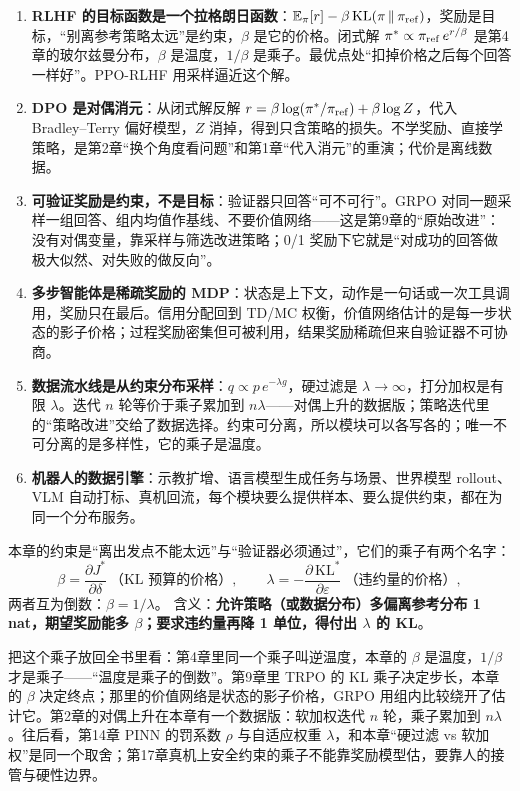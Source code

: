 \begin{enumerate}
    \item \textbf{RLHF 的目标函数是一个拉格朗日函数}：$\mathbb{E}_\pi[r] - \beta\,\mathrm{KL}(\pi\,\|\,\pi_{\rm ref})$，奖励是目标，“别离参考策略太远”是约束，$\beta$ 是它的价格。闭式解 $\pi^* \propto \pi_{\rm ref}\,e^{r/\beta}$ 是第4章的玻尔兹曼分布，$\beta$ 是温度，$1/\beta$ 是乘子。最优点处“扣掉价格之后每个回答一样好”。PPO-RLHF 用采样逼近这个解。

    \item \textbf{DPO 是对偶消元}：从闭式解反解 $r = \beta\log(\pi^*/\pi_{\rm ref}) + \beta\log Z$，代入 Bradley--Terry 偏好模型，$Z$ 消掉，得到只含策略的损失。不学奖励、直接学策略，是第2章“换个角度看问题”和第1章“代入消元”的重演；代价是离线数据。

    \item \textbf{可验证奖励是约束，不是目标}：验证器只回答“可不可行”。GRPO 对同一题采样一组回答、组内均值作基线、不要价值网络——这是第9章的“原始改进”：没有对偶变量，靠采样与筛选改进策略；0/1 奖励下它就是“对成功的回答做极大似然、对失败的做反向”。

    \item \textbf{多步智能体是稀疏奖励的 MDP}：状态是上下文，动作是一句话或一次工具调用，奖励只在最后。信用分配回到 TD/MC 权衡，价值网络估计的是每一步状态的影子价格；过程奖励密集但可被利用，结果奖励稀疏但来自验证器不可协商。

    \item \textbf{数据流水线是从约束分布采样}：$q \propto p\,e^{-\lambda g}$，硬过滤是 $\lambda \to \infty$，打分加权是有限 $\lambda$。迭代 $n$ 轮等价于乘子累加到 $n\lambda$——对偶上升的数据版；策略迭代里的“策略改进”交给了数据选择。约束可分离，所以模块可以各写各的；唯一不可分离的是多样性，它的乘子是温度。

    \item \textbf{机器人的数据引擎}：示教扩增、语言模型生成任务与场景、世界模型 rollout、VLM 自动打标、真机回流，每个模块要么提供样本、要么提供约束，都在为同一个分布服务。
\end{enumerate}

\begin{physicalmeaning}[title=$\lambda$ 在本章的意义]
本章的约束是“离出发点不能太远”与“验证器必须通过”，它们的乘子有两个名字：
\[
\beta = \frac{\partial J^*}{\partial \delta}\ \text{（KL 预算的价格）}, \qquad
\lambda = -\frac{\partial\,\mathrm{KL}^*}{\partial \varepsilon}\ \text{（违约量的价格）},
\]
两者互为倒数：$\beta = 1/\lambda$。
含义：\textbf{允许策略（或数据分布）多偏离参考分布 1 nat，期望奖励能多 $\beta$；要求违约量再降 1 单位，得付出 $\lambda$ 的 KL}。

把这个乘子放回全书里看：第4章里同一个乘子叫逆温度，本章的 $\beta$ 是温度，$1/\beta$ 才是乘子——“温度是乘子的倒数”。第9章里 TRPO 的 KL 乘子决定步长，本章的 $\beta$ 决定终点；那里的价值网络是状态的影子价格，GRPO 用组内比较绕开了估计它。第2章的对偶上升在本章有一个数据版：软加权迭代 $n$ 轮，乘子累加到 $n\lambda$。往后看，第14章 PINN 的罚系数 $\rho$ 与自适应权重 $\lambda$，和本章“硬过滤 vs 软加权”是同一个取舍；第17章真机上安全约束的乘子不能靠奖励模型估，要靠人的接管与硬性边界。
\end{physicalmeaning}

